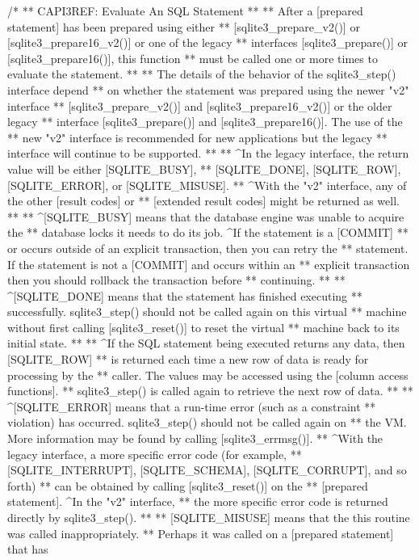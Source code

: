 \begin{Codex}[label=sqlite3.h,numbers=left]
{/*
** CAPI3REF: Evaluate An SQL Statement
**
** After a [prepared statement] has been prepared using either
** [sqlite3_prepare_v2()] or [sqlite3_prepare16_v2()] or one of the legacy
** interfaces [sqlite3_prepare()] or [sqlite3_prepare16()], this function
** must be called one or more times to evaluate the statement.
**
** The details of the behavior of the sqlite3_step() interface depend
** on whether the statement was prepared using the newer "v2" interface
** [sqlite3_prepare_v2()] and [sqlite3_prepare16_v2()] or the older legacy
** interface [sqlite3_prepare()] and [sqlite3_prepare16()].  The use of the
** new "v2" interface is recommended for new applications but the legacy
** interface will continue to be supported.
**
** ^In the legacy interface, the return value will be either [SQLITE_BUSY],
** [SQLITE_DONE], [SQLITE_ROW], [SQLITE_ERROR], or [SQLITE_MISUSE].
** ^With the "v2" interface, any of the other [result codes] or
** [extended result codes] might be returned as well.
**
** ^[SQLITE_BUSY] means that the database engine was unable to acquire the
** database locks it needs to do its job.  ^If the statement is a [COMMIT]
** or occurs outside of an explicit transaction, then you can retry the
** statement.  If the statement is not a [COMMIT] and occurs within an
** explicit transaction then you should rollback the transaction before
** continuing.
**
** ^[SQLITE_DONE] means that the statement has finished executing
** successfully.  sqlite3_step() should not be called again on this virtual
** machine without first calling [sqlite3_reset()] to reset the virtual
** machine back to its initial state.
**
** ^If the SQL statement being executed returns any data, then [SQLITE_ROW]
** is returned each time a new row of data is ready for processing by the
** caller. The values may be accessed using the [column access functions].
** sqlite3_step() is called again to retrieve the next row of data.
**
** ^[SQLITE_ERROR] means that a run-time error (such as a constraint
** violation) has occurred.  sqlite3_step() should not be called again on
** the VM. More information may be found by calling [sqlite3_errmsg()].
** ^With the legacy interface, a more specific error code (for example,
** [SQLITE_INTERRUPT], [SQLITE_SCHEMA], [SQLITE_CORRUPT], and so forth)
** can be obtained by calling [sqlite3_reset()] on the
** [prepared statement].  ^In the "v2" interface,
** the more specific error code is returned directly by sqlite3_step().
**
** [SQLITE_MISUSE] means that the this routine was called inappropriately.
** Perhaps it was called on a [prepared statement] that has
}
\end{Codex}
